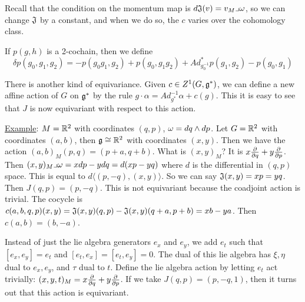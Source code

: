  Recall that the condition on the momentum map is $d\mathfrak{J}(v)=v_M\lrcorner \omega$, so we can
 change $\mathfrak{J}$ by a constant, and when we do so, the $c$ varies over the cohomology
 class.

 If $p(g,h)$ is a 2-cochain, then we define
 \[
    \delta p(g_0,g_1,g_2) = - p(g_0g_1,g_2) + p(g_0,g_1g_2) +
    Ad^*_{g_0^{-1}}p(g_1,g_2) - p(g_0,g_1)
 \]


 There is another kind of equivariance.  Given $c\in Z^1(G,\mathfrak{g}^*)$, we can define a new
 affine action of $G$ on $\mathfrak{g}^*$ by the rule $g\cdot \alpha = Ad^{-1}_{g^*}\alpha +
 c(g)$.  This it is easy to see that $J$ is now equivariant with respect to this
 action.

 \underline{Example}: $M=\mathbb{R}^2$ with coordinates $(q,p)$, $\omega=dq\wedge dp$.  Let $G=\mathbb{R}^2$ with
 coordinates $(a,b)$, then $\mathfrak{g}\cong \mathbb{R}^2$ with coordinates $(x,y)$.  Then we have the
 action $(a,b)_M(p,q)=(p+a,q+b)$.  What is $(x,y)_M$?  It is
 $x\frac{\partial }{\partial q}+y\frac{\partial }{\partial p}$.  Then $(x,y)_M\lrcorner \omega = xdp-ydq = d(xp-yq)$ where $d$
 is the differential in $(q,p)$ space.  This is equal to $d\langle
 (p,-q),(x,y)\rangle$.  So we can say $\mathfrak{J}(x,y)=xp=yq$.  Then $J(q,p)=(p,-q)$.  This is
 not equivariant because the coadjoint action is trivial.  The cocycle is
 $c(a,b,q,p)(x,y)=\mathfrak{J}(x,y)(q,p)-\mathfrak{J}(x,y)(q+a,p+b) = xb-ya$.  Then $c(a,b)=(b,-a)$.

 Instead of just the lie algebra generators $e_x$ and $e_y$, we add $e_t$ such that $[e_x,e_y]=e_t$
 and $[e_t,e_x]=[e_t,e_y]=0$.  The dual of this lie algebra has $\xi,\eta$ dual to
 $e_x,e_y$, and $\tau$ dual to $t$.  Define the lie algebra action by letting $e_t$
 act trivially: $(x,y,t)_M = x\frac{\partial }{\partial q}+y\frac{\partial }{\partial p}$.  If we take $J(q,p)=(p,-q,1)$,
 then it turns out that this action is equivariant.
